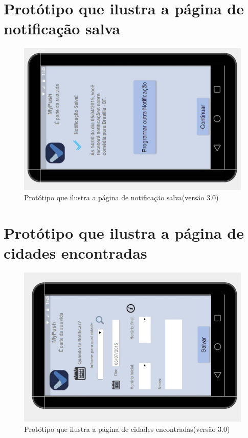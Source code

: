 \begin{apendicesenv}
      \section*{Protótipo que ilustra a página de notificação salva}

    \begin{figure}[!htbp]
      \centering
      \includegraphics[scale=0.5, angle=-90]{editaveis/figuras/prototipo_alta_fidelidade_v3/3_5}
      \caption{Protótipo que ilustra a página de notificação salva(versão 3.0)}
      \label{v3}
    \end{figure}
    
      \section*{Protótipo que ilustra a página de cidades encontradas}

    \begin{figure}[!htbp]
      \centering
      \includegraphics[scale=0.5, angle=-90]{editaveis/figuras/prototipo_alta_fidelidade_v3/3_6}
      \caption{Protótipo que ilustra a página de cidades encontradas(versão 3.0)}
      \label{v3}
    \end{figure}
    

\end{apendicesenv}
